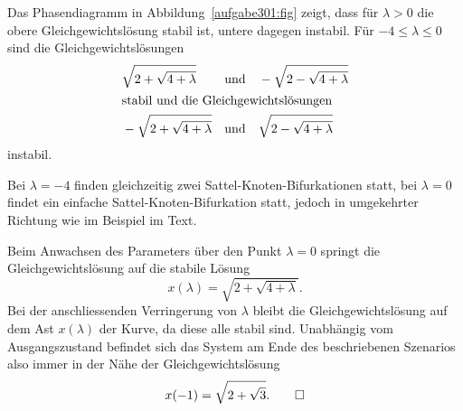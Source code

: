 \begin{loesung}
\begin{teilaufgaben}
Das Phasendiagramm in Abbildung~\ref{aufgabe301:fig} zeigt,
dass für $\lambda >0$ die obere Gleichgewichtslösung stabil ist,
untere dagegen instabil.
Für $-4\le\lambda\le 0$ sind die Gleichgewichtslösungen
\begin{align*}
&\sqrt{2+\sqrt{4+\lambda}}
&&\text{und}&
&-\sqrt{2-\sqrt{4+\lambda}}
\\
\intertext{stabil und die Gleichgewichtslösungen}
&-\sqrt{2+\sqrt{4+\lambda}}
&&\text{und}&
&\sqrt{2-\sqrt{4+\lambda}}
\end{align*}
instabil.

Bei $\lambda=-4$ finden gleichzeitig zwei Sattel-Knoten-Bifurkationen 
statt, bei $\lambda=0$ findet ein einfache Sattel-Knoten-Bifurkation
statt, jedoch in umgekehrter Richtung wie im Beispiel im Text.
\item
Beim Anwachsen des Parameters über den Punkt $\lambda=0$ springt die
Gleichgewichtslösung auf die stabile Lösung
\[
x(\lambda)=\sqrt{2+\sqrt{4+\lambda}}.
\]
Bei der anschliessenden Verringerung von $\lambda$ bleibt die 
Gleichgewichtslösung auf dem Ast $x(\lambda)$ der Kurve, da diese
alle stabil sind.
Unabhängig vom Ausgangszustand befindet sich das System am Ende des
beschriebenen Szenarios also immer in der Nähe der Gleichgewichtslösung
\[
x(-1)=\sqrt{2+\sqrt{3}}.
\qedhere
\]
\end{teilaufgaben}
\end{loesung}

